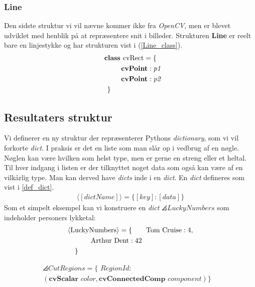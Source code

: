 {\subsubsection{Line}
Den sidste struktur vi vil nævne kommer ikke fra \emph{OpenCV}, men er
blevet udviklet med henblik på at repræsentere snit i billeder.
Strukturen \textbf{Line} er reelt bare en linjestykke og har strukturen
vist i (\ref{Line_class}).
\begin{multline}
    \textbf{class~} \textrm{cvRect} = \{ \\
    \shoveleft{\qquad\textbf{cvPoint} : \textit{p1}} \\
    \shoveleft{\qquad\textbf{cvPoint} : \textit{p2}} \\
    \shoveleft{\}}\shoveright{}
    \label{Line_class}
\end{multline}

\subsection{Resultaters struktur\label{resultat_struktur}}
Vi definerer en ny struktur der repræsenterer Pythons \emph{dictionary},
som vi vil forkorte \emph{dict}. I praksis er det en liste som man slår
op i vedbrug af en nøgle. Nøglen kan være hvilken som helst type, men er
gerne en streng eller et heltal. Til hver indgang i listen er der
tilknyttet noget data som også kan være af en vilkårlig type. Man kan
derved have \emph{dicts} inde i en \emph{dict}. En \emph{dict} defineres
som vist i \ref{def_dict}.
\begin{eqnarray}
    \langle[\textit{dictName}]\rangle = \{ [\textit{key}] : [\textit{data}] \}
    \label{def_dict}
\end{eqnarray}
Som et simpelt eksempel kan vi konstruere en \emph{dict}
$\angles{LuckyNumbers}$ som indeholder personers lykketal:
\begin{multline}
    \angles{LuckyNumbers} = \{ \qquad \textrm{Tom Cruise} : 4 , \\
    \textrm{Arthur Dent} : 42 \qquad\qquad\\
    \shoveleft{\}}\shoveright{}
    \label{lucky_dict}
\end{multline}

\begin{multline}
    \angles{CutRegions} = \{ \textit{~RegionId} : \\
    (\textbf{cvScalar~}\textit{color}, \textbf{cvConnectedComp~}\textit{component}) \}\quad
\end{multline}

}
